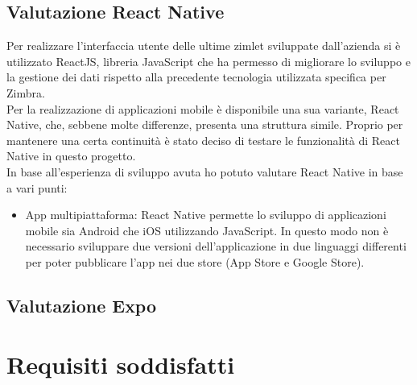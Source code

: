 \subsection{Valutazione React Native}
Per realizzare l'interfaccia utente delle ultime zimlet sviluppate dall'azienda si è utilizzato ReactJS, libreria JavaScript che ha permesso di migliorare lo sviluppo e la gestione dei dati rispetto alla precedente tecnologia utilizzata specifica per Zimbra. \\
Per la realizzazione di applicazioni mobile è disponibile una sua variante, React Native, che, sebbene molte differenze, presenta una struttura simile. Proprio per mantenere una certa continuità è stato deciso di testare le funzionalità di React Native in questo progetto. \\
In base all'esperienza di sviluppo avuta ho potuto valutare React Native in base a vari punti:
\begin{itemize}
	\item App multipiattaforma: React Native permette lo sviluppo di applicazioni mobile sia Android che iOS utilizzando JavaScript. In questo modo non è necessario sviluppare due versioni dell'applicazione in due linguaggi differenti per poter pubblicare l'app nei due store (App Store e Google Store).
\end{itemize}

\subsection{Valutazione Expo}

\section{Requisiti soddisfatti}

